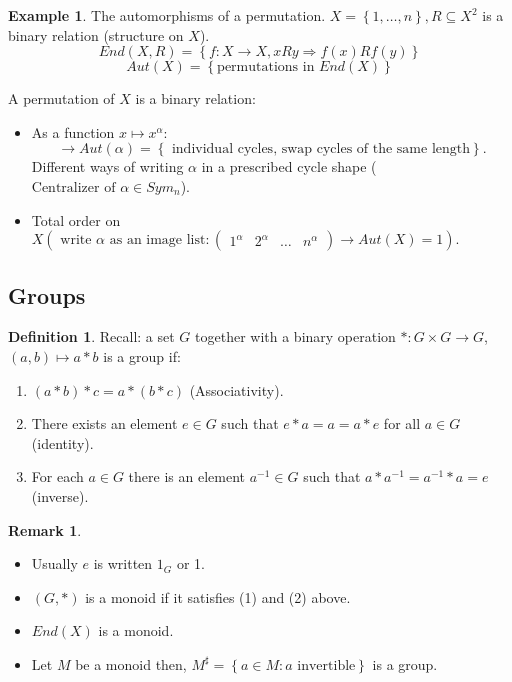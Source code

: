 \documentclass[12pt]{amsart}
\theoremstyle{definition}
\newtheorem{example}[theorem]{Example}
\newtheorem{definition}[theorem]{Definition}
\newtheorem{remark}[theorem]{Remark}
\begin{document}
\begin{example}
The automorphisms of a permutation.
$X = \left\{ 1, \ldots, n \right\}, R \subseteq X^{2}$ is a binary relation (structure on $X$).
$$End(X, R) = \left\{ f: X \rightarrow X, x R y \Rightarrow f(x) R f(y) \right\}$$
$$Aut(X) = \left\{ \text{permutations in } End(X) \right\}$$

A permutation of $X$ is a binary relation:
\begin{itemize}
\item As a function $x \mapsto x^{\alpha}$:
$$\rightarrow Aut( \alpha ) = \left\{\text{ individual cycles, swap cycles of the same length} \right\}.$$
\noindent Different ways of writing $\alpha$ in a prescribed cycle shape ($ \text{Centralizer of } \alpha \in Sym_{n}$).
\item Total order on $X \left( \text{ write $\alpha$ as an image list}: \begin{pmatrix}1^{\alpha} & 2^{\alpha} & \ldots & n^{\alpha} \end{pmatrix} \rightarrow Aut(X) = 1 \right).$
\end{itemize}
\end{example}

\subsection{Groups}
\begin{definition}
Recall: a set $G$ together with a binary operation $\ast: G \times G \rightarrow G$, $\left( a, b \right) \mapsto a \ast b$ is a group if:
\begin{enumerate}
\item $\left( a \ast b \right) \ast c = a \ast \left( b \ast c \right)$ (Associativity).
\item There exists an element $e \in G$ such that $e \ast a = a = a \ast e$ for all $a \in G$ (identity).
\item For each $a \in G$ there is an element $a^{ - 1} \in G$ such that $a \ast a^{- 1} = a^{- 1} \ast a = e$ (inverse).
\end{enumerate}
\end{definition}

\begin{remark}
\begin{itemize}
\item Usually $e$ is written $1_{G}$ or 1.
\item $\left( G, \ast \right)$ is a monoid if it satisfies (1) and (2) above.
\item $End(X)$ is a monoid.
\item Let $M$ be a monoid then, $M^{\sharp} = \left\{ a \in M : a \text{ invertible} \right\}$ is a group.
\end{itemize}
\end{remark}
\end{document}
